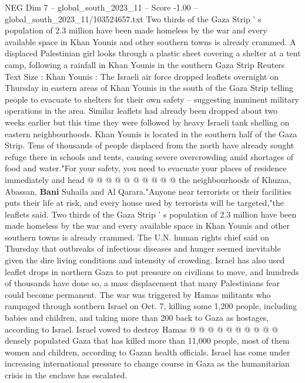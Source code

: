 \begin{textsample}{NEG Dim 7 – global\_south\_2023\_11 – Score -1.00 – global\_south\_2023\_11/103524657.txt}  \label{ex:f7_neg_159}
Two thirds of the Gaza Strip ' s population of 2.3 million have been made homeless by the war and every available space in Khan Younis and other southern towns is already crammed.
A displaced Palestinian girl looks through a plastic sheet covering a shelter at a tent camp, following a rainfall in Khan Younis in the southern Gaza Strip Reuters Text Size : Khan Younis : The Israeli air force dropped leaflets overnight on Thursday in eastern areas of Khan Younis in the south of the Gaza Strip telling people to evacuate to shelters for their own safety -- suggesting imminent military operations in the area.
Similar leaflets had already been dropped about two weeks earlier but this time they were followed by heavy Israeli tank shelling on eastern neighbourhoods.
Khan Younis is located in the southern half of the Gaza Strip.
Tens of thousands of people displaced from the north have already sought refuge there in schools and tents, causing severe overcrowding amid shortages of food and water."For your safety, you need to evacuate your places of residence immediately and head @ @ @ @ @ @ @ @ @ @ the neighbourhoods of Khuzaa, Abassan, \textbf{Bani} Suhaila and Al Qarara."Anyone near terrorists or their facilities puts their life at risk, and every house used by terrorists will be targeted,"the leaflets said.
Two thirds of the Gaza Strip ' s population of 2.3 million have been made homeless by the war and every available space in Khan Younis and other southern towns is already crammed.
The U.N. human rights chief said on Thursday that outbreaks of infectious diseases and hunger seemed inevitable given the dire living conditions and intensity of crowding.
Israel has also used leaflet drops in northern Gaza to put pressure on civilians to move, and hundreds of thousands have done so, a mass displacement that many Palestinians fear could become permanent.
The war was triggered by Hamas militants who rampaged through southern Israel on Oct. 7, killing some 1,200 people, including babies and children, and taking more than 200 back to Gaza as hostages, according to Israel.
Israel vowed to destroy Hamas @ @ @ @ @ @ @ @ @ @ densely populated Gaza that has killed more than 11,000 people, most of them women and children, according to Gazan health officials.
Israel has come under increasing international pressure to change course in Gaza as the humanitarian crisis in the enclave has escalated.

\end{textsample}
